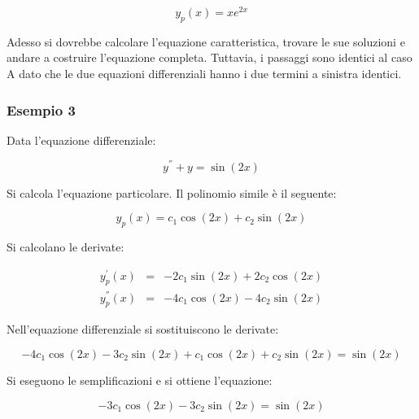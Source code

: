 \documentclass[a4paper]{article}
\begin{document}
	\begin{equation*}
		y_{p}\left(x\right) = x e^{2x}
	\end{equation*}

	\noindent
	Adesso si dovrebbe calcolare l'equazione caratteristica, trovare le sue soluzioni e andare a costruire l'equazione completa. Tuttavia, i passaggi sono identici al caso A dato che le due equazioni differenziali hanno i due termini a sinistra identici.
	
	\newpage
	
	\subsubsection[Esempio 3]{\textcolor{Green4}{Esempio 3}}
	
	Data l'equazione differenziale:
	
	\begin{equation*}
		y^{''} + y = \sin\left(2x\right)
	\end{equation*}

	Si calcola l'equazione particolare. Il polinomio simile è il seguente:
	
	\begin{equation*}
		y_{p}\left(x\right) = c_{1}\cos\left(2x\right) + c_{2}\sin\left(2x\right)
	\end{equation*}

	\noindent
	Si calcolano le derivate:
	
	\begin{equation*}
		\begin{array}{lll}
			y_{p}^{'}\left(x\right)	& = & -2c_{1}\sin\left(2x\right) + 2c_{2}\cos\left(2x\right) \\
			y_{p}^{''}\left(x\right)& = & -4c_{1}\cos\left(2x\right) - 4c_{2}\sin\left(2x\right)
		\end{array}
	\end{equation*}

	\noindent
	Nell'equazione differenziale si sostituiscono le derivate:
	
	\begin{equation*}
		-4c_{1}\cos\left(2x\right) - 3c_{2}\sin\left(2x\right) + c_{1}\cos\left(2x\right) + c_{2}\sin\left(2x\right) = \sin\left(2x\right)
	\end{equation*}

	\noindent
	Si eseguono le semplificazioni e si ottiene l'equazione:
	
	\begin{equation*}
		-3c_{1}\cos\left(2x\right) - 3c_{2}\sin\left(2x\right) = \sin\left(2x\right)
	\end{equation*}
\end{document}
